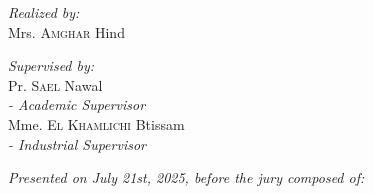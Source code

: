 \begin{titlepage}
    \vspace{1cm} %

    \begin{minipage}{0.48\textwidth}
        \begin{flushleft} \large
            \emph{Realized by:}\\
            Mrs. \textsc{Amghar} Hind
        \end{flushleft}
    \end{minipage}\hfill
    \begin{minipage}{0.48\textwidth}
        \begin{flushleft} \large %
            \emph{Supervised by:} \\
            Pr. \textsc{Sael} Nawal  \\
            \textit{- Academic Supervisor}\\[3mm]
            Mme. \textsc{El Khamlichi} Btissam \\
            \textit{- Industrial Supervisor}
           
           


        \end{flushleft}
    

    \end{minipage}

    \vfill %

    {\large \textit{Presented on July 21st, 2025, before the jury composed of:}}\\[5mm]

\begin{tabular}{ll}
   

\end{tabular}
\end{titlepage}

